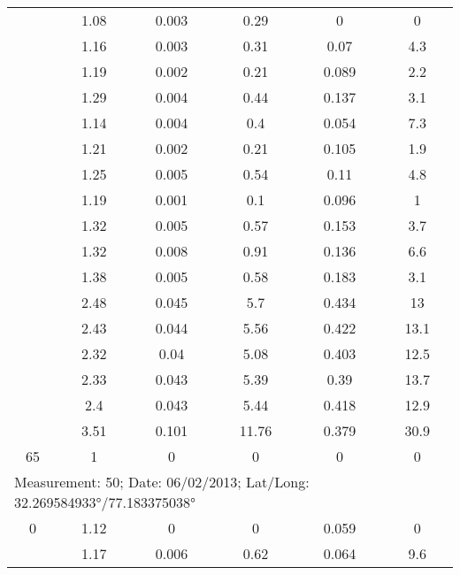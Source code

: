 \begin{longtable}{cccccc}
		& 1.08  & 0.003 & 0.29  & 0     & 0 \\
		
		& 1.16  & 0.003 & 0.31  & 0.07  & 4.3 \\
		
		& 1.19  & 0.002 & 0.21  & 0.089 & 2.2 \\
		
		& 1.29  & 0.004 & 0.44  & 0.137 & 3.1 \\
		
		& 1.14  & 0.004 & 0.4   & 0.054 & 7.3 \\
		
		& 1.21  & 0.002 & 0.21  & 0.105 & 1.9 \\
		
		& 1.25  & 0.005 & 0.54  & 0.11  & 4.8 \\
		
		& 1.19  & 0.001 & 0.1   & 0.096 & 1 \\
		
		& 1.32  & 0.005 & 0.57  & 0.153 & 3.7 \\
		
		& 1.32  & 0.008 & 0.91  & 0.136 & 6.6 \\
		
		& 1.38  & 0.005 & 0.58  & 0.183 & 3.1 \\
		
		& 2.48  & 0.045 & 5.7   & 0.434 & 13 \\
		
		& 2.43  & 0.044 & 5.56  & 0.422 & 13.1 \\
		
		& 2.32  & 0.04  & 5.08  & 0.403 & 12.5 \\
		
		& 2.33  & 0.043 & 5.39  & 0.39  & 13.7 \\
		
		& 2.4   & 0.043 & 5.44  & 0.418 & 12.9 \\
		
		& 3.51  & 0.101 & 11.76 & 0.379 & 30.9 \\
		
		65    & 1     & 0     & 0     & 0     & 0 \\
		\midrule
		\multicolumn{6}{l}{Measurement: 50; Date: 06/02/2013;
			Lat/Long: 32.269584933°/77.183375038°} \\		
		\midrule
		0     & 1.12  & 0     & 0     & 0.059 & 0 \\
		
		& 1.17  & 0.006 & 0.62  & 0.064 & 9.6 \\
		

\end{longtable}
